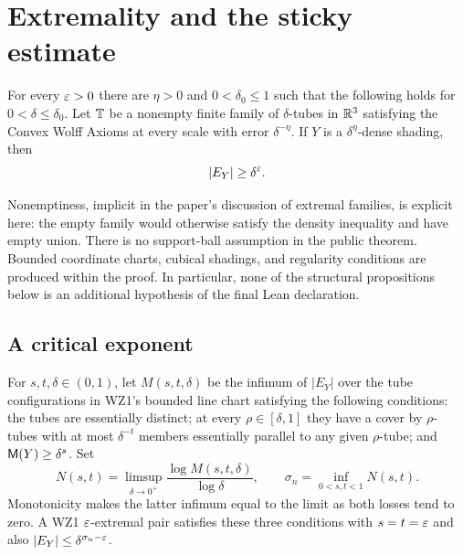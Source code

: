 \chapter{Extremality and the sticky estimate}
\label{chap:sticky}

\begin{theorem}
\label{thm:sticky}
\leanok
{}
For every $\varepsilon>0$ there are $\eta>0$ and $0<\delta_0\leq1$ such
that the following holds for $0<\delta\leq\delta_0$. Let $\mathbb{T}$ be a
nonempty finite family of $\delta$-tubes in $\mathbb{R}^3$ satisfying the Convex
Wolff Axioms at every scale with error $\delta^{-\eta}$. If $Y$ is a
$\delta^\eta$-dense shading, then
\[
                  |E_Y|\geq\delta^\varepsilon.
\]
\end{theorem}

\begin{remark}
\label{rem:endpoint}
Nonemptiness, implicit in the paper's discussion of extremal families,
is explicit here: the empty family would otherwise satisfy the density
inequality and have empty union. There is no support-ball assumption
in the public theorem. Bounded coordinate charts, cubical shadings,
and regularity conditions are produced within the proof. In particular,
none of the structural propositions below is an additional hypothesis
of the final Lean declaration.
\end{remark}

\section{A critical exponent}

\begin{definition}
\label{def:wz1-extremal}
For $s,t,\delta\in(0,1)$, let $M(s,t,\delta)$ be the infimum of
$|E_Y|$ over the tube configurations in WZ1's bounded line chart
satisfying the following conditions: the tubes are essentially
distinct; at every $\rho\in[\delta,1]$ they have a cover by
$\rho$-tubes with at most $\delta^{-t}$ members essentially parallel
to any given $\rho$-tube; and $\mathsf{M}(Y)\geq\delta^s$.
Set
\[
 N(s,t)=\limsup_{\delta\to0^+}
              \frac{\log M(s,t,\delta)}{\log\delta},\qquad
 \sigma_n=\inf_{0<s,t<1}N(s,t).
\]
Monotonicity makes the latter infimum equal to the limit as both
losses tend to zero. A WZ1 $\varepsilon$-extremal pair
satisfies these three conditions with $s=t=\varepsilon$ and also
$|E_Y|\leq\delta^{\sigma_n-\varepsilon}$.
\end{definition}

